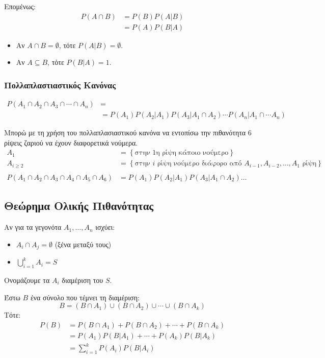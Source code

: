 \documentclass[11pt,a4paper,titlepage,draft]{article}
\begin{document}
Επομένως:
\begin{align*}
P(A \cap B) &= P(B)P(A|B) \\ &= P(A)P(B|A)
\end{align*}

\begin{itemize}
\item Αν \(A\cap B = \emptyset\), τότε \(P(A|B) = \emptyset\).
\item Αν \(A \subseteq B\), τότε \(P(B|A) = 1\).
\end{itemize}

\subsubsection{Πολλαπλαστιαστικός Κανόνας}
\begin{align*}
P(A_1 \cap A_2 \cap A_3 \cap \cdots \cap A_n) &= \\
&=P(A_1)P(A_2|A_1)P(A_3|A_1\cap A_2)\cdots P(A_n|A_1 \cap \cdots A_n)
\end{align*}

Μπορώ με τη χρήση του πολλαπλασιαστικού κανόνα να εντοπίσω την πιθανότητα 6 ρίψεις ζαριού να έχουν διαφορετικά νούμερα.
\begin{align*}
A_1 &= \left\lbrace \text{στην 1η ρίψη κάποιο νούμερο}  \right\rbrace \\
A_{i \geq 2} &= \left\lbrace \text{στην }i\text{ ρίψη νούμερο διάφορο από } A_{i-1},A_{i-2},\dots,A_1\text{ ρίψη}  \right\rbrace
\\\\
P(A_1 \cap A_2 \cap A_3 \cap A_4 \cap A_5 \cap A_6) &= P(A_1)P(A_2|A_1)P(A_3|A_1\cap A_2)\dots
\end{align*}

\subsection{Θεώρημα Ολικής Πιθανότητας}
Αν για τα γεγονότα \(A_1,\dots,A_n\) ισχύει:
\begin{itemize}
\item \(A_i \cap A_j = \emptyset\) (ξένα μεταξύ τους)
\item \( \bigcup\limits_{i=1}^k A_i = S \)
\end{itemize}
Ονομάζουμε τα \(A_i\) διαμέριση του \(S\).

Έστω \(B\) ένα σύνολο που τέμνει τη διαμέριση:
\[
B = (B \cap A_1) \cup (B \cap A_2) \cup \cdots \cup (B \cap A_k)
\]
Τότε:
\begin{align*}
P(B)&=P(B \cap A_1)+P(B \cap A_2)+ \cdots + P(B \cap A_k) \\
&=P(A_1)P(B|A_1)+\cdots+P(A_k)P(B|A_k) \\
& = \sum_{i=1}^k P(A_i)P(B|A_i)
\end{align*}
\end{document}

